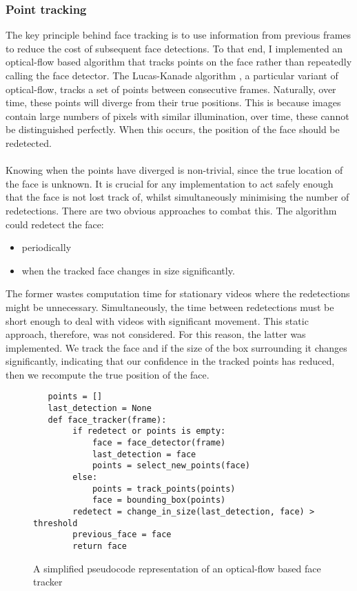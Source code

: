 \subsubsection{Point tracking}
The key principle behind face tracking is to use information from previous frames to reduce the cost of subsequent face detections.
To that end, I implemented an optical-flow based algorithm that tracks points on the face rather than repeatedly calling the face detector. The Lucas-Kanade algorithm \cite{LucasKanade}, a particular variant of optical-flow, tracks a set of points between consecutive frames. Naturally, over time, these points will diverge from their true positions. This is because images contain large numbers of pixels with similar illumination, over time, these cannot be distinguished perfectly. When this occurs, the position of the face should be redetected. 
\\ \\
Knowing when the points have diverged is non-trivial, since the true location of the face is unknown. It is crucial for any implementation to act safely enough that the face is not lost track of, whilst simultaneously minimising the number of redetections.
There are two obvious approaches to combat this. The algorithm could redetect the face: 
\begin{itemize}
    \item periodically 
    \item when the tracked face changes in size significantly. 
\end{itemize}
The former wastes computation time for stationary videos where the redetections might be unnecessary. Simultaneously, the time between redetections must be short enough to deal with videos with significant movement. This static approach, therefore, was not considered. For this reason, the latter was implemented. We track the face and if the size of the box surrounding it changes significantly, indicating that our confidence in the tracked points has reduced, then we recompute the true position of the face.
\begin{figure}[!h]
\begin{verbatim}
   points = []
   last_detection = None
   def face_tracker(frame):
        if redetect or points is empty:
            face = face_detector(frame) 
            last_detection = face
            points = select_new_points(face)
        else:
            points = track_points(points)
            face = bounding_box(points)
        redetect = change_in_size(last_detection, face) > threshold
        previous_face = face
        return face
\end{verbatim}
\caption{A simplified pseudocode representation of an optical-flow based face tracker}
\end{figure} 
